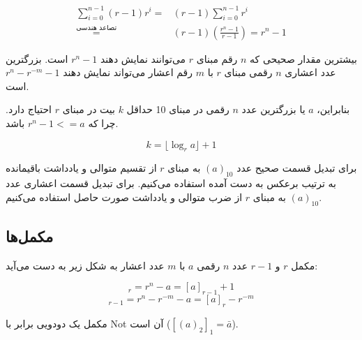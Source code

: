 \documentclass[a5paper]{article}
\begin{document}
\begin{equation}\begin{split}
  \sum_{i=0}^{n-1}(r-1)r^{i} = &(r-1)\sum_{i=0}^{n-1}r^{i}\\
  \stackrel{\text{تصاعد هندسی}}{=} &(r-1)(\frac{r^{n}-1}{r-1}) = r^{n} -1
\end{split}\end{equation}

بیشترین مقدار صحیحی که $n$ رقم مبنای $r$ می‌توانند نمایش دهند $r^{n} - 1$ است.
بزرگترین عدد اعشاری $n$ رقمی مبنای $r$ با $m$ رقم اعشار می‌تواند نمایش دهند $r^{n} - r^{-m} - 1$ است.

بنابراین، $a$ یا بزرگترین عدد $n$ رقمی در مبنای 10 حداقل $k$ بیت در مبنای $r$ احتیاج دارد. چرا که $r^{n}-1 <= a$ باشد.

\begin{equation}
  k = \lfloor \log_{r}a \rfloor + 1
\end{equation}

برای تبدیل قسمت صحیح عدد $(a)_{10}$ به مبنای $r$ از تقسیم متوالی و یادداشت باقیمانده به ترتیب برعکس به دست آمده استفاده می‌کنیم.
برای تبدیل قسمت اعشاری عدد $(a)_{10}$ به مبنای $r$ از ضرب متوالی و یادداشت صورت حاصل استفاده می‌کنیم.

\subsection{مکمل‌ها}
مکمل $r$ و $r-1$ عدد $n$ رقمی $a$ با $m$ عدد اعشار به شکل زیر به دست می‌آید:

\begin{equation}
  [a]_{r} = r^{n} - a = [a]_{r-1} + 1 \label{eq:radix}
\end{equation}
\begin{equation}
  [a]_{r-1} = r^{n} - r^{-m} - a = [a]_{r} - r^{-m}
\end{equation}

مکمل یک دودویی برابر با Not آن است ($[(a)_{2}]_{1} = \bar{a}$).
\end{document}

